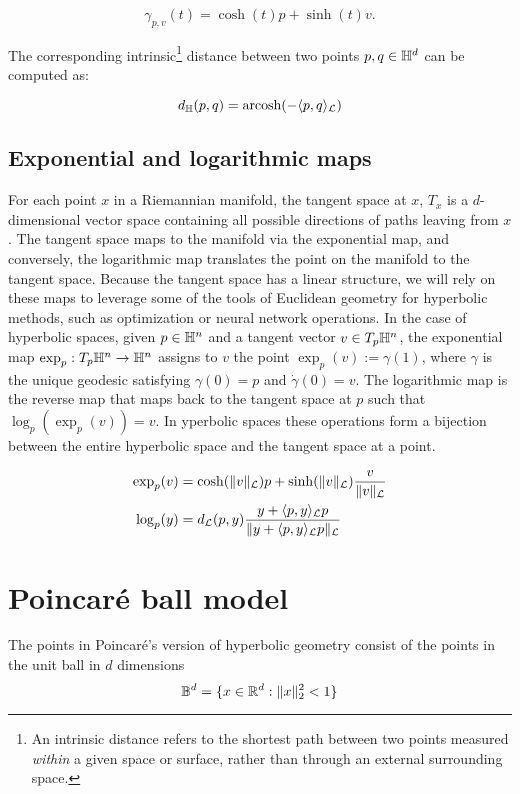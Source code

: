 \begin{equation*}
    \gamma_{p,v}(t) = \cosh(t)p + \sinh(t)v.
\end{equation*}

The corresponding intrinsic\footnote{An intrinsic distance refers to the shortest path between two points measured \emph{within} a given space or surface, rather than through an external surrounding space.} distance between two points $p,q\in\mathbb{H}^d$ can be computed as:

\begin{equation*}
    d_{\mathbb{H}}(p, q) = \text{arcosh}(-\langle p, q \rangle_{\mathcal{L}})
\end{equation*}

\subsection{Exponential and logarithmic maps}
For each point $x$ in a Riemannian manifold, the tangent space at $x$, $T_x$ is a $d$-dimensional vector space containing all possible directions of paths leaving from $x$. The tangent space maps to the manifold via the exponential map, and conversely, the logarithmic map translates the point on the manifold to the tangent space. Because the tangent space has a linear structure, we will rely on these maps to leverage some of the tools of Euclidean geometry for hyperbolic methods, such as optimization or neural network operations.
In the case of hyperbolic spaces, given $p \in \mathbb{H}^n$ and a tangent vector $v \in T_p\mathbb{H}^n$, the exponential map $\exp_p: T_p\mathbb{H}^n \to \mathbb{H}^n$ assigns to $v$ the point $\exp_p(v) := \gamma(1)$, where $\gamma$ is the unique geodesic satisfying $\gamma(0) = p$ and $\dot{\gamma}(0) = v$. The logarithmic map is the reverse map that maps back to the tangent space at $p$ such that $\log_p(\exp_p(v)) = v$. In yperbolic spaces these operations form a bijection between the entire hyperbolic space and the tangent space at a point.


\begin{align*}
    \exp_p(v) &= \cosh(\|v\|_{\mathcal{L}})p + \sinh(\|v\|_{\mathcal{L}}) \frac{v}{\|v\|_{\mathcal{L}}}\\
    \log_p(y) &= d_{\mathcal{L}}(p,y)\frac{y + \langle p,y \rangle_{\mathcal{L}}p}{\|y + \langle p,y \rangle_{\mathcal{L}}p\|_{\mathcal{L}}}
\end{align*}



\section{Poincaré ball model}
The points in Poincaré's version of hyperbolic geometry consist of the points in the unit ball in $d$ dimensions
\begin{equation*}
    \mathbb{B}^d = \{x \in \mathbb{R}^d: \|x\|^2_2 < 1\}
\end{equation*}

